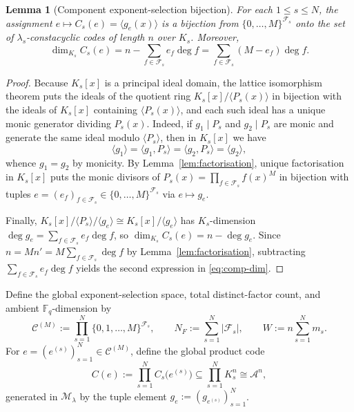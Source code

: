 \documentclass[preprint,12pt]{elsarticle}
\newcommand{\F}{\mathbb F}
\newcommand{\A}{\mathcal A}
\newcommand{\Fs}{\mathcal F_s}
\numberwithin{equation}{section}
\theoremstyle{plain}
\newtheorem{lemma}[theorem]{Lemma}
\theoremstyle{definition}
\theoremstyle{remark}
\begin{document}
\begin{lemma}[Component exponent-selection bijection]\label{lem:component-bijection}
For each $1\le s\le N$, the assignment $e\mapsto C_s(e)=\langle g_e(x)\rangle$
is a bijection from $\{0,\dots,M\}^{\Fs}$ onto the set of $\lambda_s$-constacyclic
codes of length $n$ over $K_s$. Moreover,
\begin{equation}\label{eq:comp-dim}
\dim_{K_s} C_s(e)=n-\sum_{f\in\Fs} e_f\deg f
                 =\sum_{f\in\Fs}(M-e_f)\deg f.
\end{equation}
\end{lemma}

\begin{proof}
Because $K_s[x]$ is a principal ideal domain, the lattice isomorphism theorem
puts the ideals of the quotient ring $K_s[x]/\langle P_s(x)\rangle$ in bijection
with the ideals of $K_s[x]$ containing $\langle P_s(x)\rangle$, and each such
ideal has a unique monic generator dividing $P_s(x)$. Indeed, if $g_1\mid P_s$
and $g_2\mid P_s$ are monic and generate the same ideal modulo $\langle P_s\rangle$,
then in $K_s[x]$ we have
\[
\langle g_1\rangle=\langle g_1,P_s\rangle=\langle g_2,P_s\rangle=\langle g_2\rangle,
\]
whence $g_1=g_2$ by monicity. By Lemma~\ref{lem:factorisation}, unique
factorisation in $K_s[x]$ puts the monic divisors of
$P_s(x)=\prod_{f\in\Fs}f(x)^M$ in bijection with tuples
$e=(e_f)_{f\in\Fs}\in\{0,\dots,M\}^{\Fs}$ via $e\mapsto g_e$.

Finally, $K_s[x]/\langle P_s\rangle\big/\langle g_e\rangle\cong K_s[x]/\langle g_e\rangle$
has $K_s$-dimension $\deg g_e=\sum_{f\in\Fs}e_f\deg f$, so
$\dim_{K_s}C_s(e)=n-\deg g_e$. Since $n=Mn'=M\sum_{f\in\Fs}\deg f$ by
Lemma~\ref{lem:factorisation}, subtracting $\sum_{f\in\Fs}e_f\deg f$ yields the
second expression in \eqref{eq:comp-dim}.
\end{proof}

Define the global exponent-selection space, total distinct-factor count, and
ambient $\F_q$-dimension by
\begin{equation}\label{eq:selection-space}
\mathscr C^{(M)}:=\prod_{s=1}^{N}\{0,1,\dots,M\}^{\Fs},
\qquad
N_F:=\sum_{s=1}^{N}|\Fs|,
\qquad
W:=n\sum_{s=1}^{N}m_s.
\end{equation}
For $e=(e^{(s)})_{s=1}^{N}\in\mathscr C^{(M)}$, define the global product code
\begin{equation}\label{eq:global-code}
C(e):=\prod_{s=1}^{N} C_s\bigl(e^{(s)}\bigr)
     \subseteq\prod_{s=1}^{N}K_s^n\cong\A^n,
\end{equation}
generated in $\mathcal M_\lambda$ by the tuple element $g_e:=(g_{e^{(s)}})_{s=1}^{N}$.
\end{document}
